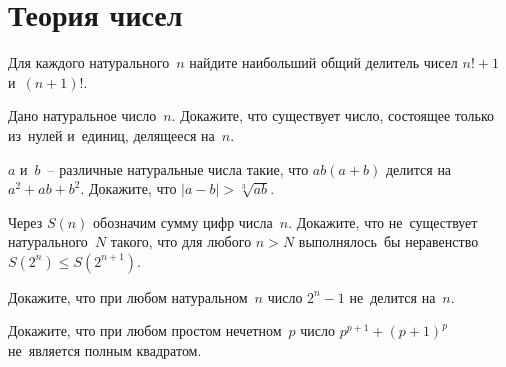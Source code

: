 
\section*{Теория чисел}


\begingroup
    \def\abs#1{\lvert #1 \rvert}

\begin{problems}

\item
Для каждого натурального~$n$ найдите наибольший общий делитель чисел $n! + 1$
и~$(n + 1)!$.

\item
Дано натуральное число~$n$.
Докажите, что существует число, состоящее только из~нулей и~единиц, делящееся
на~$n$.

\item
$a$ и~$b$~-- различные натуральные числа такие, что $a b (a + b)$ делится
на~$a^2 + a b + b^2$.
Докажите, что $\abs{a - b} > \sqrt[3]{a b}$.

\item
Через $S(n)$ обозначим сумму цифр числа~$n$.
Докажите, что не~существует натурального~$N$ такого, что для любого $n > N$
выполнялось~бы неравенство $S(2^n) \leq S(2^{n+1})$.

\item
Докажите, что при любом натуральном~$n$ число $2^n - 1$ не~делится на~$n$.

\item
Докажите, что при любом простом нечетном~$p$ число $p^{p+1} + (p + 1)^p$
не~является полным квадратом. 


\end{problems}

\endgroup %

